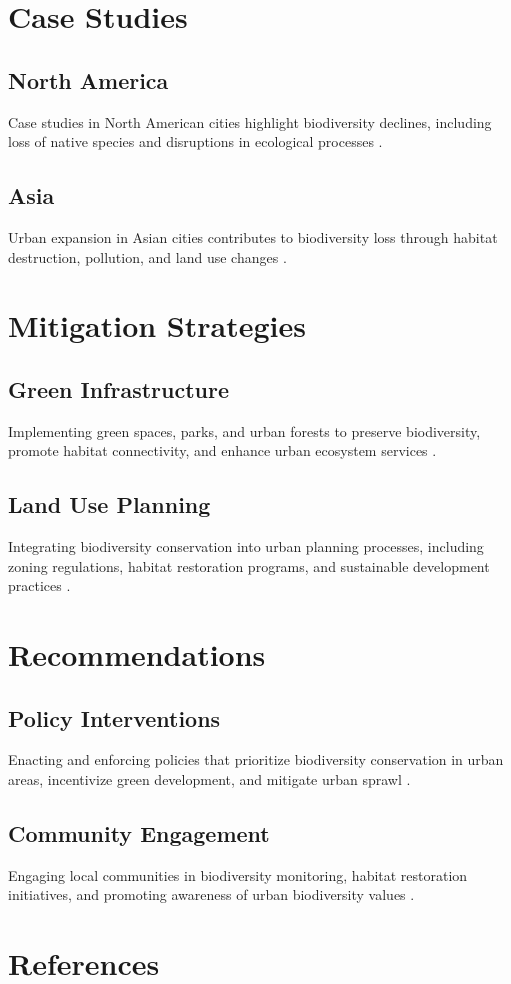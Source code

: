\documentclass[12pt]{article}
\begin{document}
\section{Case Studies}
\subsection{North America}
Case studies in North American cities highlight biodiversity declines, including loss of native species and disruptions in ecological processes \citep{mcdonald2008urbanization, aronson2014biodiversity}.

\subsection{Asia}
Urban expansion in Asian cities contributes to biodiversity loss through habitat destruction, pollution, and land use changes \citep{seto2012global, gopal2017urban}.

\section{Mitigation Strategies}
\subsection{Green Infrastructure}
Implementing green spaces, parks, and urban forests to preserve biodiversity, promote habitat connectivity, and enhance urban ecosystem services \citep{marusenko2019green, miller2019urban}.

\subsection{Land Use Planning}
Integrating biodiversity conservation into urban planning processes, including zoning regulations, habitat restoration programs, and sustainable development practices \citep{alberti2017urban, collins2011biodiversity}.

\section{Recommendations}
\subsection{Policy Interventions}
Enacting and enforcing policies that prioritize biodiversity conservation in urban areas, incentivize green development, and mitigate urban sprawl \citep{marull2015social, mcdonnell2016biodiversity}.

\subsection{Community Engagement}
Engaging local communities in biodiversity monitoring, habitat restoration initiatives, and promoting awareness of urban biodiversity values \citep{pereira2019engaging, shwartz2016urban}.

\section*{References}


\end{document}

